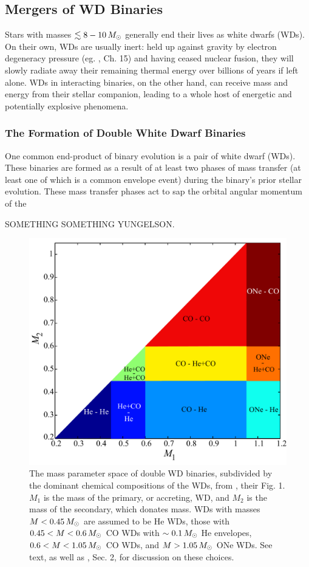 
\subsection{Mergers of WD Binaries}
\label{ssec:c1_wdmergers_sub}

Stars with masses $\lesssim8-10\,\Msun$ generally end their lives as white dwarfs (WDs).  On their own, WDs are usually inert: held up against gravity by electron degeneracy pressure (eg. \cite{kippww12}, Ch. 15) and having ceased nuclear fusion, they will slowly radiate away their remaining thermal energy over billions of years if left alone.  WDs in interacting binaries, on the other hand, can receive mass and energy from their stellar companion, leading to a whole host of energetic and potentially explosive phenomena.

\subsubsection{The Formation of Double White Dwarf Binaries}

One common end-product of binary evolution is a pair of white dwarf (WDs).    These binaries are formed as a result of at least two phases of mass transfer (at least one of which is a common envelope event) during the binary's prior stellar evolution.  These mass transfer phases act to sap the orbital angular momentum of the 



{\charles SOMETHING SOMETHING YUNGELSON.}

\begin{figure}
\centering
\includegraphics[width=0.6\hsize]{introduction/figures/dan+12_wdbinmass.pdf}
\caption{The mass parameter space of double WD binaries, subdivided by the dominant chemical compositions of the WDs, from \cite{dan+12}, their Fig. 1.  $M_1$ is the mass of the primary, or accreting, WD, and $M_2$ is the mass of the secondary, which donates mass.  WDs with masses $M<0.45\,\Msun$ are assumed to be He WDs, those with $0.45 < M < 0.6\,\Msun$ CO WDs with $\sim0.1\,\Msun$ He envelopes, $0.6 < M < 1.05\,\Msun$ CO WDs, and $M>1.05\,\Msun$ ONe WDs.  See text, as well as \cite{dan+12}, Sec. 2, for discussion on these choices.}
\label{fig:c1_wdbinarymasses}
\end{figure}

